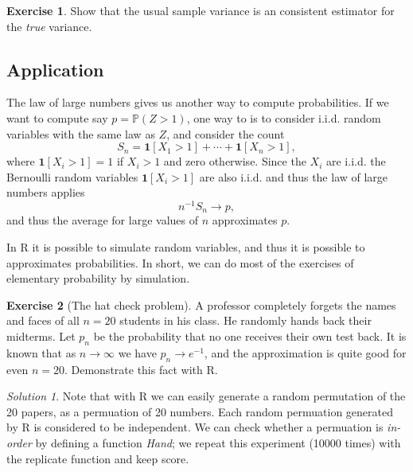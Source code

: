\documentclass[
]{article}
\theoremstyle{definition}
\theoremstyle{definition}
\theoremstyle{definition}
\newtheorem{exercise}{Exercise}[section]
\theoremstyle{remark}
\newtheorem*{solution}{Solution}
\begin{document}
\begin{exercise}
\protect\hypertarget{exr:unnamed-chunk-8}{}{\label{exr:unnamed-chunk-8} }Show that the usual sample variance is an consistent estimator for the \emph{true} variance.
\end{exercise}

\hypertarget{application}{%
\subsection{Application}\label{application}}

The law of large numbers gives us another way to compute probabilities. If we want to compute say \(p=\mathbb{P}( Z> 1)\), one way to is to consider i.i.d. random variables with the same law as \(Z\), and consider the count
\[ S_n = \mathbf{1}[X_1 >1] + \cdots + \mathbf{1}[X_n >1],\]
where \(\mathbf{1}[X_i >1] =1\) if \(X_i >1\) and zero otherwise. Since the \(X_i\) are i.i.d. the Bernoulli random variables \(\mathbf{1}[X_i >1]\) are also i.i.d. and thus the law of large numbers applies\\
\[ n^{-1} S_n \to p,\]
and thus the average for large values of \(n\) approximates \(p\).

In R it is possible to simulate random variables, and thus it is possible to approximates probabilities. In short, we can do most of the exercises of elementary probability by simulation.

\begin{exercise}[The hat check problem]
\protect\hypertarget{exr:unnamed-chunk-9}{}{\label{exr:unnamed-chunk-9} \iffalse (The hat check problem) \fi{} }A professor completely forgets the names and faces of all \(n=20\) students in his class. He randomly hands back their midterms. Let \(p_n\) be the probability that no one receives their own test back. It is known that as \(n \to \infty\) we have \(p_n \to e^{-1}\), and the approximation is quite good for even \(n=20\). Demonstrate this fact with R.\\
\end{exercise}
\begin{solution}
\iffalse{} {Solution. } \fi{}
Note that with R we can easily generate a random permutation of the 20 papers, as a permuation of 20 numbers. Each random permuation generated by R is considered to be independent. We can check whether a permuation is \emph{in-order} by defining a function \emph{Hand}; we repeat this experiment (10000 times) with the replicate function and keep score.
\end{solution}
\end{document}
